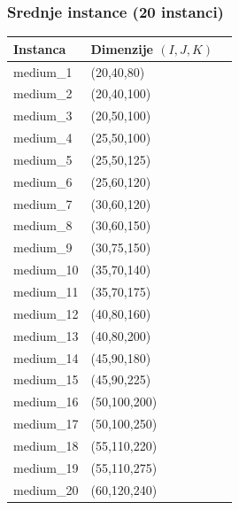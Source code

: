 \documentclass[12pt,a4paper]{article}
\begin{document}
\subsubsection*{Srednje instance (20 instanci)}
\begin{center}
\begin{tabular}{lll}
\toprule
\textbf{Instanca} & \textbf{Dimenzije} $(I,J,K)$ \\
\midrule
medium\_1  & (20,40,80) \\
medium\_2  & (20,40,100) \\
medium\_3  & (20,50,100) \\
medium\_4  & (25,50,100) \\
medium\_5  & (25,50,125) \\
medium\_6  & (25,60,120) \\
medium\_7  & (30,60,120) \\
medium\_8  & (30,60,150) \\
medium\_9  & (30,75,150) \\
medium\_10 & (35,70,140) \\
medium\_11 & (35,70,175) \\
medium\_12 & (40,80,160) \\
medium\_13 & (40,80,200) \\
medium\_14 & (45,90,180) \\
medium\_15 & (45,90,225) \\
medium\_16 & (50,100,200) \\
medium\_17 & (50,100,250) \\
medium\_18 & (55,110,220) \\
medium\_19 & (55,110,275) \\
medium\_20 & (60,120,240) \\
\bottomrule
\end{tabular}
\end{center}
\end{document}
